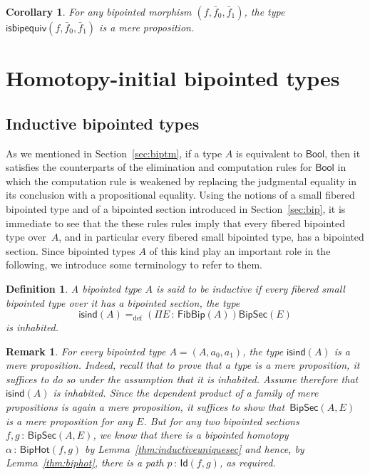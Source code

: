 \documentclass[10pt,a4paper,oneside,reqno]{amsart}
\numberwithin{equation}{section}
\theoremstyle{mythm}
\newtheorem{corollary}[theorem]{Corollary}
\theoremstyle{mydef}
\newtheorem{definition}[theorem]{Definition}
\theoremstyle{myrmk}
\newtheorem{remark}[theorem]{Remark}
\newcommand{\ie}{\text{i.e.\ }}
\newcommand{\defeq}{=_{\mathrm{def}}}
\newcommand{\co}{\,{:}\,}
\newcommand{\isbipind}{\mathsf{isind}}
\newcommand{\Bool}{\mathsf{Bool}}
\newcommand{\Id}{\mathsf{Id}}
\newcommand{\BipHot}{\mathsf{BipHot}}
\newcommand{\FibBip}{\mathsf{FibBip}}
\newcommand{\BipSec}{\mathsf{BipSec}}
\newcommand{\isbipequiv}{\mathsf{isbipequiv}}
\begin{document}
\begin{corollary} For any bipointed morphism $(f, \bar{f}_0, \bar{f}_1)$, the type $\isbipequiv(f, \bar{f}_0, \bar{f}_1)$ is a mere proposition.
\end{corollary} 





\section{Homotopy-initial bipointed types} 
\label{sec:homibt}


\subsection{Inductive bipointed types} 
As we mentioned  in Section~\ref{sec:biptm}, if a type $A$ is equivalent to $\Bool$, then 
it satisfies the counterparts of the elimination and computation rules for $\Bool$ in which the computation rule is 
weakened by replacing the judgmental equality in its conclusion with a propositional equality. Using the notions of a small fibered bipointed type and of a bipointed section introduced in Section~\ref{sec:bip}, it is immediate to see that the these rules rules imply that every fibered bipointed type over~$A$, and in particular every fibered small bipointed type, has a bipointed section. 
Since bipointed types $A$ of this kind  play an important role in the following, we introduce some terminology to refer to them.


 



\begin{definition} A bipointed type $A$ is said to be \emph{inductive} if every fibered small bipointed type over it has a bipointed section, \ie the type
\[ 
\isbipind(A) \defeq (\Pi E \co \FibBip(A))  \BipSec(E)
\]  
is inhabited. \end{definition} 



\begin{remark} For every bipointed type $A = (A, a_0, a_1)$, the type $\isbipind(A)$ is a mere proposition. Indeed, recall that to prove that a type  is a mere proposition, it suffices to do so under the assumption that it is inhabited. Assume therefore that~$\isbipind(A)$ is inhabited. Since the dependent product of a family of mere propositions is again a mere proposition, it suffices to show that~$\BipSec(A,E)$ is a mere proposition for any $E$. But for any two bipointed sections~$f, g \co \BipSec(A,E)$, we know that there is a 
bipointed homotopy $\alpha \co \BipHot(f,g)$ by Lemma~\ref{thm:inductiveuniquesec} and hence, by 
Lemma~\ref{thm:biphot}, there is a path $p \co \Id(f,g)$, as required. 
\end{remark}
\end{document}
